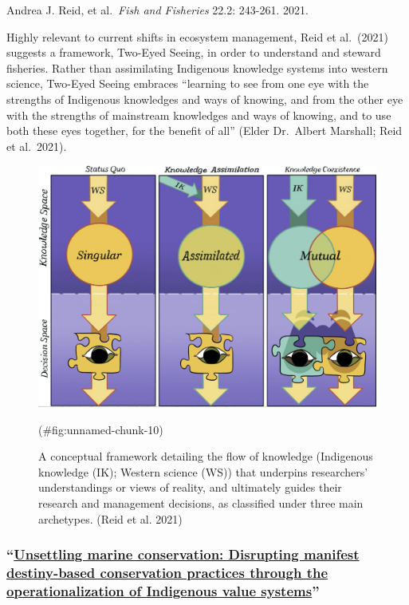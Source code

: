 \documentclass[
]{book}
\begin{document}
Andrea J. Reid, et al.~\emph{Fish and Fisheries} 22.2: 243-261. 2021.

Highly relevant to current shifts in ecosystem management, Reid et al.~(2021) suggests a framework, Two-Eyed Seeing, in order to understand and steward fisheries. Rather than assimilating Indigenous knowledge systems into western science, Two-Eyed Seeing embraces ``learning to see from one eye with the strengths of Indigenous knowledges and ways of knowing, and from the other eye with the strengths of mainstream knowledges and ways of knowing, and to use both these eyes together, for the benefit of all'' (Elder Dr.~Albert Marshall; Reid et al.~2021).

\begin{figure}
\includegraphics[width=29in]{images/Reid_2021} \caption{A conceptual framework detailing the flow of knowledge (Indigenous knowledge (IK); Western science (WS)) that underpins researchers’ understandings or views of reality, and ultimately guides their research and management decisions, as classified under three main archetypes. (Reid et al. 2021)}(\#fig:unnamed-chunk-10)
\end{figure}

\hypertarget{unsettling-marine-conservation-disrupting-manifest-destiny-based-conservation-practices-through-the-operationalization-of-indigenous-value-systems}{%
\subsubsection*{\texorpdfstring{``\href{(https://escholarship.org/uc/item/3sm1f1vq)}{Unsettling marine conservation: Disrupting manifest destiny-based conservation practices through the operationalization of Indigenous value systems}''}{``Unsettling marine conservation: Disrupting manifest destiny-based conservation practices through the operationalization of Indigenous value systems''}}\label{unsettling-marine-conservation-disrupting-manifest-destiny-based-conservation-practices-through-the-operationalization-of-indigenous-value-systems}}
\end{document}
